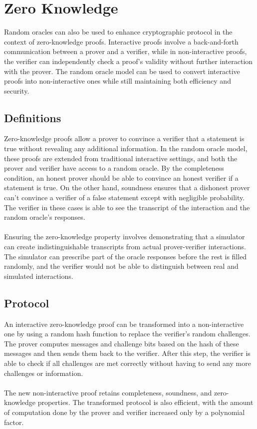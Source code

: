 \documentclass{article}
\begin{document}
\section{Zero Knowledge}

Random oracles can also be used to enhance cryptographic protocol in the context of zero-knowledge proofs. Interactive proofs involve a back-and-forth communication between a prover and a verifier, while in non-interactive proofs, the verifier can independently check a proof's validity without further interaction with the prover. The random oracle model can be used to convert interactive proofs into non-interactive ones while still maintaining both efficiency and security.

\subsection{Definitions}
Zero-knowledge proofs allow a prover to convince a verifier that a statement is true without revealing any additional information. In the random oracle model, these proofs are extended from traditional interactive settings, and both the prover and verifier have access to a random oracle. By the completeness condition, an honest prover should be able to convince an honest verifier if a statement is true. On the other hand, soundness ensures that a dishonest prover can't convince a verifier of a false statement except with negligible probability. The verifier in these cases is able to see the transcript of the interaction and the random oracle's responses.
\\\\
Ensuring the zero-knowledge property involves demonstrating that a simulator can create indistinguishable transcripts from actual prover-verifier interactions. The simulator can prescribe part of the oracle responses before the rest is filled randomly, and the verifier would not be able to distinguish between real and simulated interactions.


\subsection{Protocol}
An interactive zero-knowledge proof can be transformed into a non-interactive one by using a random hash function to replace the verifier's random challenges. The prover computes messages and challenge bits based on the hash of these messages and then sends them back to the verifier. After this step, the verifier is able to check if all challenges are met correctly without having to send any more challenges or information.
\\\\
The new non-interactive proof retains completeness, soundness, and zero-knowledge properties. The transformed protocol is also efficient, with the amount of computation done by the prover and verifier increased only by a polynomial factor.
\end{document}
